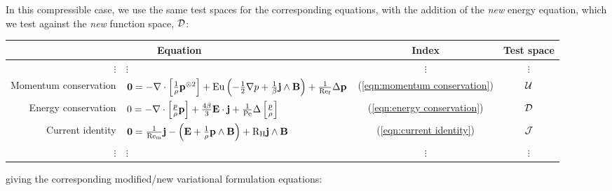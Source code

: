     In this compressible case, we use the same test spaces for the corresponding equations, with the addition of the \emph{new} energy equation, which we test against the \emph{new} function space, $\mathcal{D}$: 
    \begin{center}\begin{tabular}{ r l c | c }
        \multicolumn{2}{c}{Equation}  &  Index  &  Test space  \\
        \hline\hline
        $\vdots$  &  $\vdots$  &  $\vdots$  &  $\vdots$  \\
        Momentum conservation  &  $\mathbf{0} 
         =  - \nabla\cdot\left[\frac{1}{\rho}\mathbf{p}^{\otimes 2}\right] + \mathrm{Eu}\left(- \frac{1}{2}\nabla p + \frac{1}{\beta}\mathbf{j}\wedge\mathbf{B}\right) + \frac{1}{\mathrm{Re}_{\mathrm{f}}}\Delta\mathbf{p}$  &  (\ref{eqn:momentum conservation})  &  $\mathcal{U}$  \\
        Energy conservation  &  $0  =  - \nabla\cdot\left[\frac{p}{\rho}\mathbf{p}\right] + \frac{4\beta}{3}\mathbf{E}\cdot\mathbf{j} + \frac{1}{\mathrm{Pe}}\Delta\left[\frac{p}{\rho}\right]$  &  (\ref{eqn:energy conservation})  &  $\mathcal{D}$  \\
        \hline
        Current identity  &  $\mathbf{0}  =  \frac{1}{\mathrm{Re}_{\mathrm{m}}}\mathbf{j} - \left(\mathbf{E} + \frac{1}{\rho}\mathbf{p}\wedge\mathbf{B}\right) + \mathrm{R}_{\mathrm{H}}\mathbf{j}\wedge\mathbf{B}$  &  (\ref{eqn:current identity})  &  $\mathcal{J}$  \\
        \hline
        $\vdots$  &  $\vdots$  &  $\vdots$  &  $\vdots$  \\
    \end{tabular}\end{center}
    giving the corresponding modified/new variational formulation equations:
